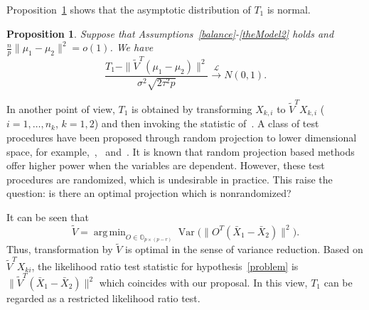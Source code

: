 \documentclass[review]{elsarticle}
\DeclareMathOperator{\myVar}{Var}
\theoremstyle{plain}
\newtheorem{proposition}{\quad\quad Proposition}
\theoremstyle{definition}
\theoremstyle{remark}
\begin{document}

Proposition~\ref{oracleTheorem} shows that the asymptotic distribution of $T_1$ is normal.
\begin{proposition}\label{oracleTheorem}
    Suppose that Assumptions~\ref{balance}-\ref{theModel2} holds and  $\frac{n}{p}\|\mu_1-\mu_2\|^2= o(1)$. We have 
    \begin{equation*}
        \frac{T_1-\|\tilde{V}^T(\mu_1-\mu_2)\|^2}
        {\sigma^2\sqrt{2\tau^2 p}}\xrightarrow{\mathcal{L}}N(0,1).
    \end{equation*}
\end{proposition}



In another point of view,
$T_1$ is obtained by transforming $X_{k,i}$ to $\tilde{V}^T X_{k,i}$ ($i=1,\ldots, n_k$, $k=1,2$) and then invoking the statistic of~\cite{Chen2010A}.
A class of test procedures have been proposed through random projection to lower dimensional space, for example,~\cite{Lopes2015A},~\cite{Thulin2014A} and~\cite{Srivastava2014RAPTT}.
It is known that random projection based methods offer higher power when the variables are dependent.
However, these test procedures are randomized, which is undesirable in practice.
This raise the question: is there an optimal projection which is nonrandomized?

It can be seen that
$$
\tilde{V}=\mathop{\operatorname{arg\,min}}_{O\in\mathbb{O}_{p\times(p-r)}}\myVar\big(\|O^T(\bar{X}_1-\bar{X}_2)\|^2\big).
$$
Thus, transformation by $\tilde{V}$ is optimal in the sense of variance reduction.
 Based on $\tilde{V}^T X_{ki}$, the likelihood ratio test statistic for hypothesis~\eqref{problem} is
    $\|\tilde{V}^T (\bar{X}_1-\bar{X}_2)\|^2$ which coincides with our proposal.
    In this view, $T_1$ can be regarded as a restricted likelihood ratio test.
\end{document}
